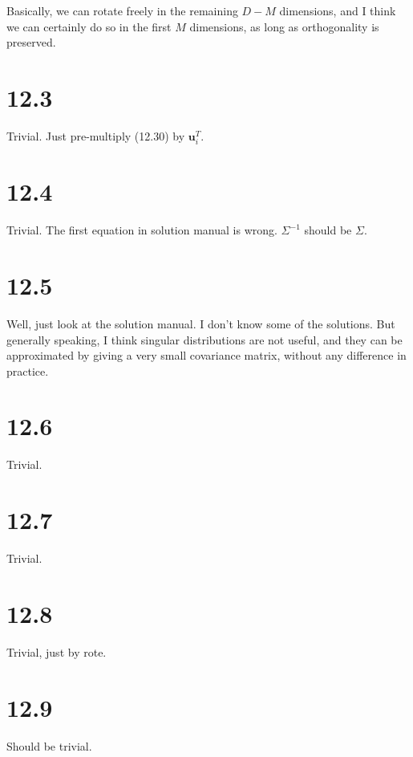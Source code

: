 \documentclass[12pt]{article}
\newcommand{\vect}[1]{\boldsymbol{#1}}
\begin{document}
Basically, we can rotate freely in the remaining $D-M$ dimensions, and I think we can certainly do so in the first $M$ dimensions, as long as orthogonality is preserved.


\section{12.3} %
\label{sec:12_3}
Trivial. Just pre-multiply (12.30) by $\vect{u}_i^T$.

\section{12.4} %
\label{sec:12_4}
Trivial. The first equation in solution manual is wrong. $\Sigma^{-1}$ should be $\Sigma$.

\section{12.5} %
\label{sec:12_5}
Well, just look at the solution manual. I don't know some of the solutions. But generally speaking, I think singular distributions are not useful, and they can be approximated by giving a very small covariance matrix, without any difference in practice.

\section{12.6} %
\label{sec:12_6}
Trivial.

\section{12.7} %
\label{sec:12_7}
Trivial.


\section{12.8} %
\label{sec:12_8}
Trivial, just by rote.

\section{12.9} %
\label{sec:12_9}
Should be trivial.
\end{document}
